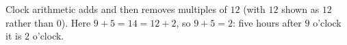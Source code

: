 Clock arithmetic adds and then removes multiples of $12$ (with $12$ shown as $12$ rather than $0$). Here $9+5=14=12+2$, so $9+5=\boxed{2}$: five hours after $9$ o'clock it is $2$ o'clock.
